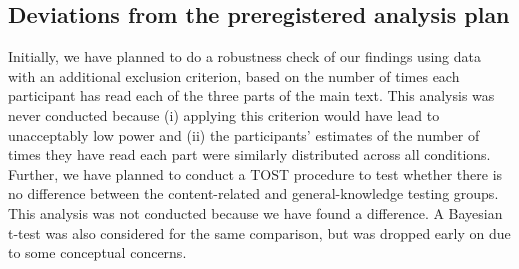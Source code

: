 \documentclass[../main.tex]{subfiles}
\begin{document}
\hypertarget{deviations-from-the-preregistered-analysis-plan}{%
\subsection{Deviations from the preregistered analysis
plan}\label{deviations-from-the-preregistered-analysis-plan}}

Initially, we have planned to do a robustness check of our findings
using data with an additional exclusion criterion, based on the number
of times each participant has read each of the three parts of the main
text. This analysis was never conducted because (i) applying this
criterion would have lead to unacceptably low power and (ii) the
participants' estimates of the number of times they have read each part
were similarly distributed across all conditions. Further, we have
planned to conduct a TOST procedure to test whether there is no
difference between the content-related and general-knowledge testing
groups. This analysis was not conducted because we have found a
difference. A Bayesian t-test was also considered for the same
comparison, but was dropped early on due to some conceptual concerns.
\end{document}
